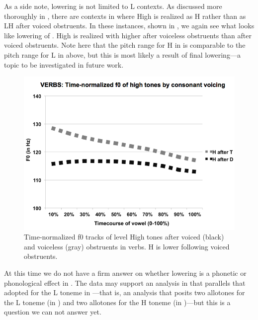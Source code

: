 \documentclass[output=paper
,newtxmath
,modfonts
,nonflat]{langsci/langscibook}
\begin{document}
As a side note,   lowering is not limited to L  contexts. As discussed more thoroughly in , there are contexts in  where High  is realized as H rather than as LH after voiced obstruents. In these instances, shown in , we again see what looks like  lowering of . High  is realized with higher  after voiceless obstruents than after voiced obstruents. Note here that the pitch range for H  in  is comparable to the pitch range for L  in  above, but this is most likely a result of final lowering—a topic to be investigated in future work. 

  
\begin{figure}

\includegraphics[width=\textwidth]{figures/Lotven-img6.png}
\caption{\label{fig:lotven:5} Time-normalized f0 tracks of level High tones after voiced (black) and voiceless (gray) obstruents in verbs. H is lower following voiced obstruents.}
\end{figure}


At this time we do not have a firm answer on whether   lowering is a phonetic or phonological effect in . The data may support an analysis in  that parallels that adopted for the L toneme in —that is, an analysis that posits two allotones for the L toneme (in ) and two allotones for the H toneme (in )—but this is a question we can not answer yet. 
\end{document}

